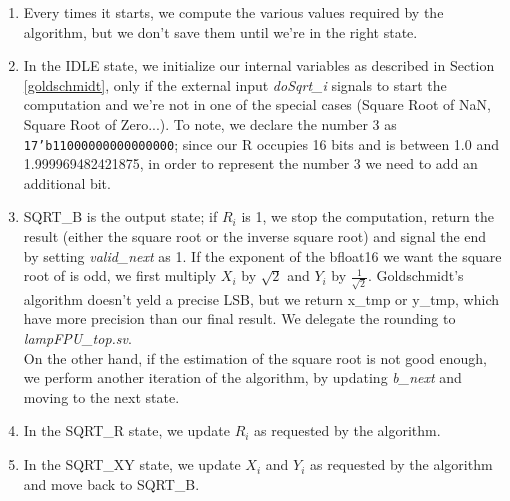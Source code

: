 \begin{enumerate}
\item Every times it starts, we compute the various values required by the algorithm, but we don't save them until we're in the right state.
\item In the IDLE state, we initialize our internal variables as described in Section \ref{goldschmidt}, only if the external input \emph{doSqrt\_i} signals to start the computation and we're not in one of the special cases (Square Root of NaN, Square Root of Zero...). To note, we declare the number 3 as \texttt{17'b11000000000000000}; since our R occupies 16 bits and is between 1.0 and 1.999969482421875, in order to represent the number 3 we need to add an additional bit. 
\item SQRT\_B is the output state; if $R_i$ is 1, we stop the computation, return the result (either the square root or the inverse square root) and signal the end by setting \emph{valid\_next} as 1. If the exponent of the bfloat16 we want the square root of is odd, we first multiply $X_i$ by $\sqrt{2}$ and $Y_i$ by $\frac{1}{\sqrt{2}}$. Goldschmidt's algorithm doesn't yeld a precise LSB, but we return x\_tmp or y\_tmp, which have more precision than our final result. We delegate the rounding to \emph{lampFPU\_top.sv}. \\
On the other hand, if the estimation of the square root is not good enough, we perform another iteration of the algorithm, by updating \emph{b\_next} and moving to the next state.
\item In the SQRT\_R state, we update $R_i$ as requested by the algorithm.
\item In the SQRT\_XY state, we update $X_i$ and $Y_i$ as requested by the algorithm and move back to SQRT\_B.
\end{enumerate}

